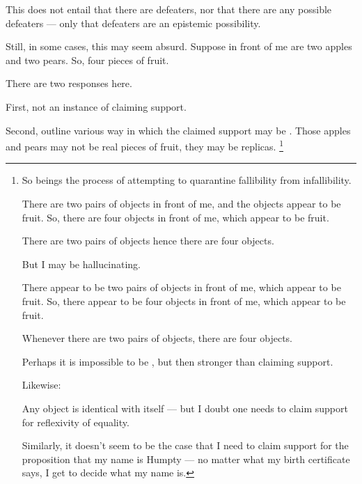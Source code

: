 \begin{note}
  This does not entail that there are defeaters, nor that there are any possible defeaters --- only that defeaters are an epistemic possibility.

  Still, in some cases, this may seem absurd.
  Suppose in front of me are two apples and two pears.
  So, four pieces of fruit.

  There are two responses here.

  First, not an instance of claiming support.

  Second, outline various way in which the claimed support may be \mom{}.
  Those apples and pears may not be real pieces of fruit, they may be replicas.\nolinebreak
  \footnote{
    So beings the process of attempting to quarantine fallibility from infallibility.

    There are two pairs of objects in front of me, and the objects appear to be fruit.
    So, there are four objects in front of me, which appear to be fruit.

    There are two pairs of objects hence there are four objects.

    But I may be hallucinating.

    There appear to be two pairs of objects in front of me, which appear to be fruit.
    So, there appear to be four objects in front of me, which appear to be fruit.

    Whenever there are two pairs of objects, there are four objects.

    Perhaps it is impossible to be \mom{}, but then stronger than claiming support.

    Likewise:

    Any object is identical with itself --- but I doubt one needs to claim support for reflexivity of equality.

    Similarly, it doesn't seem to be the case that I need to claim support for the proposition that my name is Humpty --- no matter what my birth certificate says, I get to decide what my name is.
  }
\end{note}

